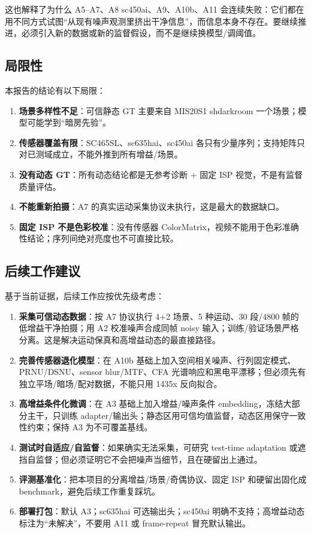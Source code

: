 \documentclass[11pt,a4paper,UTF8,fontset=fandol]{ctexart}
\begin{document}
这也解释了为什么 A5--A7、A8 sc450ai、A9、A10b、A11 会连续失败：它们都在用不同方式试图“从现有噪声观测里挤出干净信息”，而信息本身不存在。要继续推进，必须引入新的数据或新的监督假设，而不是继续换模型/调阈值。

\subsection{局限性}

本报告的结论有以下局限：

\begin{enumerate}
  \item \textbf{场景多样性不足}：可信静态 GT 主要来自 MIS20S1 shdarkroom 一个场景；模型可能学到“暗房先验”。
  \item \textbf{传感器覆盖有限}：SC465SL、sc635hai、sc450ai 各只有少量序列；支持矩阵只对已测域成立，不能外推到所有增益/场景。
  \item \textbf{没有动态 GT}：所有动态结论都是无参考诊断 + 固定 ISP 视觉，不是有监督质量评估。
  \item \textbf{不能重新拍摄}：A7 的真实运动采集协议未执行，这是最大的数据缺口。
  \item \textbf{固定 ISP 不是色彩校准}：没有传感器 ColorMatrix，视频不能用于色彩准确性结论；序列间绝对亮度也不可直接比较。
\end{enumerate}

\subsection{后续工作建议}

基于当前证据，后续工作应按优先级考虑：

\begin{enumerate}
  \item \textbf{采集可信动态数据}：按 A7 协议执行 4+2 场景、5 种运动、30 段/4800 帧的低增益干净拍摄；用 A2 校准噪声合成同帧 noisy 输入；训练/验证场景严格分离。这是解决运动保真和高增益动态的最直接路径。
  \item \textbf{完善传感器退化模型}：在 A10b 基础上加入空间相关噪声、行列固定模式、PRNU/DSNU、sensor blur/MTF、CFA 光谱响应和黑电平漂移；但必须先有独立平场/暗场/配对数据，不能只用 1435x 反向拟合。
  \item \textbf{高增益条件化微调}：在 A3 基础上加入增益/噪声条件 embedding，冻结大部分主干，只训练 adapter/输出头；静态区用可信均值监督，动态区用保守一致性约束；保持 A3 为不可覆盖基线。
  \item \textbf{测试时自适应/自监督}：如果确实无法采集，可研究 test-time adaptation 或遮挡自监督；但必须证明它不会把噪声当细节，且在硬留出上通过。
  \item \textbf{评测基准化}：把本项目的分离增益/场景/奇偶协议、固定 ISP 和硬留出固化成 benchmark，避免后续工作重复踩坑。
  \item \textbf{部署打包}：默认 A3；sc635hai 可选输出头；sc450ai 明确不支持；高增益动态标注为“未解决”，不要用 A11 或 frame-repeat 冒充默认输出。
\end{enumerate}
\end{document}
